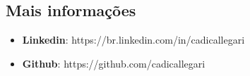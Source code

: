 \documentclass[margin]{res}
\begin{document}
\begin{resume}
\section{Mais informações}
    \begin{itemize}
        \item \textbf{Linkedin}: https://br.linkedin.com/in/cadicallegari
        \item \textbf{Github}: https://github.com/cadicallegari
    \end{itemize}


\end{resume}
\end{document}
